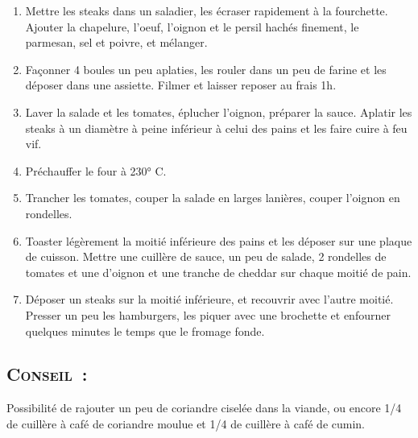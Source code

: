 \begin{enumerate}
\item Mettre les steaks dans un saladier, les \'ecraser rapidement \`a la fourchette. Ajouter la chapelure, l'oeuf, l'oignon et le persil hach\'es finement, le parmesan, sel et poivre, et m\'elanger. 
\item Façonner 4 boules un peu aplaties, les rouler dans un peu de farine et les d\'eposer dans une assiette. Filmer et laisser reposer au frais 1h.
\item Laver la salade et les tomates, \'eplucher l'oignon, pr\'eparer la sauce. Aplatir les steaks \`a un diam\`etre \`a peine inf\'erieur \`a celui des pains et les faire cuire \`a feu vif.
\item Pr\'echauffer le four \`a 230° C. 
\item Trancher les tomates, couper la salade en larges lani\`eres, couper l'oignon en rondelles. 
\item Toaster l\'eg\`erement la moiti\'e inf\'erieure des pains et les d\'eposer sur une plaque de cuisson. Mettre une cuill\`ere de sauce, un peu de salade, 2 rondelles de tomates et une d'oignon et une tranche de cheddar sur chaque moiti\'e de pain. 
\item D\'eposer un steaks sur la moiti\'e inf\'erieure, et recouvrir avec l'autre moiti\'e. Presser un peu les hamburgers, les piquer avec une brochette et enfourner quelques minutes le temps que le fromage fonde.
\end{enumerate}
\subsection*{\textsc{Conseil~:}}
Possibilit\'e de rajouter un peu de coriandre cisel\'ee dans la viande, ou encore 1/4 de cuill\`ere \`a caf\'e de coriandre moulue et 1/4 de cuill\`ere \`a caf\'e de cumin.

